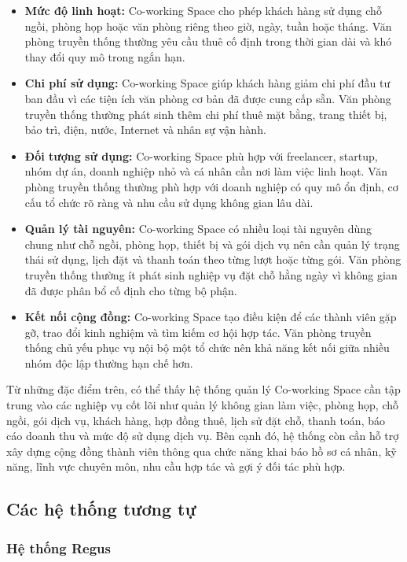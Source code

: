 \begin{itemize}
    \item \textbf{Mức độ linh hoạt:} Co-working Space cho phép khách hàng sử dụng chỗ ngồi, phòng họp hoặc văn phòng riêng theo giờ, ngày, tuần hoặc tháng. Văn phòng truyền thống thường yêu cầu thuê cố định trong thời gian dài và khó thay đổi quy mô trong ngắn hạn.
    \item \textbf{Chi phí sử dụng:} Co-working Space giúp khách hàng giảm chi phí đầu tư ban đầu vì các tiện ích văn phòng cơ bản đã được cung cấp sẵn. Văn phòng truyền thống thường phát sinh thêm chi phí thuê mặt bằng, trang thiết bị, bảo trì, điện, nước, Internet và nhân sự vận hành.
    \item \textbf{Đối tượng sử dụng:} Co-working Space phù hợp với freelancer, startup, nhóm dự án, doanh nghiệp nhỏ và cá nhân cần nơi làm việc linh hoạt. Văn phòng truyền thống thường phù hợp với doanh nghiệp có quy mô ổn định, cơ cấu tổ chức rõ ràng và nhu cầu sử dụng không gian lâu dài.
    \item \textbf{Quản lý tài nguyên:} Co-working Space có nhiều loại tài nguyên dùng chung như chỗ ngồi, phòng họp, thiết bị và gói dịch vụ nên cần quản lý trạng thái sử dụng, lịch đặt và thanh toán theo từng lượt hoặc từng gói. Văn phòng truyền thống thường ít phát sinh nghiệp vụ đặt chỗ hằng ngày vì không gian đã được phân bổ cố định cho từng bộ phận.
    \item \textbf{Kết nối cộng đồng:} Co-working Space tạo điều kiện để các thành viên gặp gỡ, trao đổi kinh nghiệm và tìm kiếm cơ hội hợp tác. Văn phòng truyền thống chủ yếu phục vụ nội bộ một tổ chức nên khả năng kết nối giữa nhiều nhóm độc lập thường hạn chế hơn.
\end{itemize}

Từ những đặc điểm trên, có thể thấy hệ thống quản lý Co-working Space cần tập trung vào các nghiệp vụ cốt lõi như quản lý không gian làm việc, phòng họp, chỗ ngồi, gói dịch vụ, khách hàng, hợp đồng thuê, lịch sử đặt chỗ, thanh toán, báo cáo doanh thu và mức độ sử dụng dịch vụ. Bên cạnh đó, hệ thống còn cần hỗ trợ xây dựng cộng đồng thành viên thông qua chức năng khai báo hồ sơ cá nhân, kỹ năng, lĩnh vực chuyên môn, nhu cầu hợp tác và gợi ý đối tác phù hợp.

\subsection{Các hệ thống tương tự}

\subsubsection{Hệ thống Regus}

